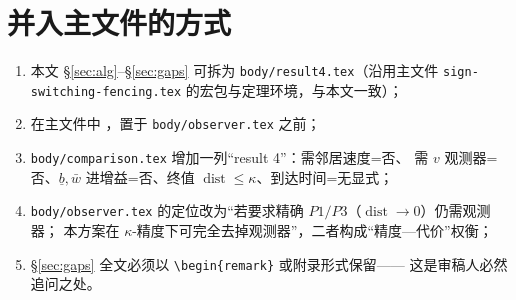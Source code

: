\documentclass[11pt,a4paper]{article}
\newcommand{\ub}{\underline{b}}
\newcommand{\dist}{\operatorname{dist}}
\theoremstyle{plain}
\theoremstyle{definition}
\theoremstyle{remark}
\newtheorem{remark}[theorem]{Remark}
\begin{document}
\section{并入主文件的方式}\label{sec:merge}
\begin{enumerate}[label=\arabic*.]
\item 本文 §\ref{sec:alg}--§\ref{sec:gaps} 可拆为 \texttt{body/result4.tex}（沿用主文件
\texttt{sign-switching-fencing.tex} 的宏包与定理环境，与本文一致）；
\item 在主文件中 \verb||，置于 \texttt{body/observer.tex} 之前；
\item \texttt{body/comparison.tex} 增加一列“result 4”：需邻居速度=否、
需 $v$ 观测器=否、$\ub,\bar w$ 进增益=否、终值 $\dist\le\kappa$、到达时间=无显式；
\item \texttt{body/observer.tex} 的定位改为“若要求精确 $P1/P3$（$\dist\to0$）仍需观测器；
本方案在 $\kappa$-精度下可完全去掉观测器”，二者构成“精度—代价”权衡；
\item §\ref{sec:gaps} 全文必须以 \verb|\begin{remark}| 或附录形式保留——
这是审稿人必然追问之处。
\end{enumerate}

\appendix
\end{document}
